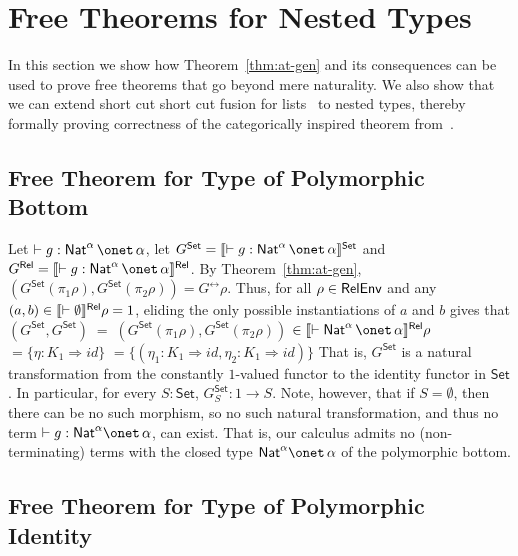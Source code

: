 \documentclass{lmcs}
\theoremstyle{plain}\newtheorem{satz}[thm]{Satz}
\newcommand{\set}{\mathsf{Set}}
\renewcommand{\id}{\mathit{id}}
\begin{document}
{\section{Free Theorems for Nested Types}\label{sec:ftnt}

In this section we show how Theorem~\ref{thm:at-gen} and its
consequences can be used to prove free theorems that go beyond mere
naturality.  We also show that we can extend short cut short cut
fusion for lists~\cite{glp93} to nested types, thereby formally
proving correctness of the categorically inspired theorem
from~\cite{jg10}.

\subsection{Free Theorem for Type of Polymorphic
  Bottom}\label{sec:bottom} 

Let $ \vdash g : \Nat^\alpha \,\onet\,\alpha$, let $G^\set =
\setsem{\vdash g : \Nat^\alpha \,\onet\,\alpha}$ and $G^\rel =
\relsem{\vdash g : \Nat^\alpha \,\onet\,\alpha}$.  By
Theorem~\ref{thm:at-gen}, $(G^\set(\pi_1\rho),G^\set(\pi_2\rho)) =
G^\rel\rho$. Thus, for all $\rho \in \mathsf{RelEnv}$ and any $(a, b) \in
\llbracket{\vdash \emptyset}\rrbracket^{\mathsf{Rel}}\rho = 1$, eliding the only possible
instantiations of $a$ and $b$ gives that $(G^\set,G^\set) \;= \;
(G^\set(\pi_1 \rho), G^\set (\pi_2 \rho))$ $ \in \relsem{\vdash
  \Nat^\alpha \,\onet\,\alpha}\rho$ $ = \{\eta : K_1 \Rightarrow
\id\}$ $ = \{(\eta_1 : K_1 \Rightarrow \id, \eta_2 : K_1 \Rightarrow
\id)\}$ That is, $G^\set$ is a natural transformation from the
constantly $1$-valued functor to the identity functor in $\set$. In
particular, for every $S : \set$, $G^\set_S : 1 \to S$. Note, however,
that if $S = \emptyset$, then there can be no such morphism, so no
such natural transformation, and thus no term $\vdash g : \Nat^\alpha
\onet \,\alpha$, can exist.  That is, our calculus admits no
(non-terminating) terms with the closed type $\Nat^\alpha \onet
\,\alpha$ of the polymorphic bottom.

\subsection{Free Theorem for Type of Polymorphic
  Identity}\label{sec:identity} 

}
\end{document}
